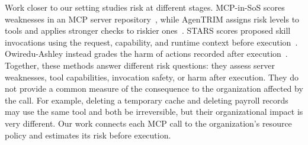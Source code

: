 Work closer to our setting studies risk at different stages. MCP-in-SoS scores
weaknesses in an MCP server repository~\cite{kumar2026mcpinsos}, while
AgenTRIM assigns risk levels to tools and applies stronger checks to riskier
ones~\cite{betser2026agentrim}. STARS scores proposed skill invocations using
the request, capability, and runtime context before
execution~\cite{zhang2026stars}. Owiredu-Ashley instead grades the harm of
actions recorded after execution~\cite{owireduashley2026severity}. Together,
these methods answer different risk questions: they assess server weaknesses,
tool capabilities, invocation safety, or harm after execution. They do not
provide a common measure of the consequence to the organization affected by
the call. For example, deleting a temporary cache and deleting payroll records
may use the same tool and both be irreversible, but their organizational impact
is very different. Our work connects each MCP call to the organization's
resource policy and estimates its risk before execution.
